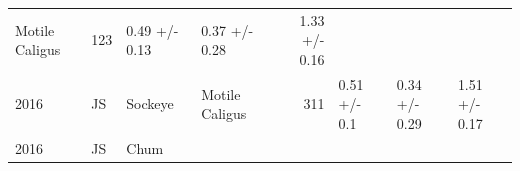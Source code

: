 \documentclass[fleqn,10pt]{wlpeerj} %
\begin{document}
\begin{longtable}[]{@{}llllrlll@{}}
\begin{minipage}[t]{0.11\columnwidth}
Motile Caligus\strut
\end{minipage} & \begin{minipage}[t]{0.04\columnwidth}\raggedleft\strut
123\strut
\end{minipage} & \begin{minipage}[t]{0.14\columnwidth}\raggedright\strut
0.49 +/- 0.13\strut
\end{minipage} & \begin{minipage}[t]{0.14\columnwidth}\raggedright\strut
0.37 +/- 0.28\strut
\end{minipage} & \begin{minipage}[t]{0.14\columnwidth}\raggedright\strut
1.33 +/- 0.16\strut
\end{minipage}\tabularnewline
\begin{minipage}[t]{0.09\columnwidth}\raggedright\strut
2016\strut
\end{minipage} & \begin{minipage}[t]{0.06\columnwidth}\raggedright\strut
JS\strut
\end{minipage} & \begin{minipage}[t]{0.06\columnwidth}\raggedright\strut
Sockeye\strut
\end{minipage} & \begin{minipage}[t]{0.11\columnwidth}\raggedright\strut
Motile Caligus\strut
\end{minipage} & \begin{minipage}[t]{0.04\columnwidth}\raggedleft\strut
311\strut
\end{minipage} & \begin{minipage}[t]{0.14\columnwidth}\raggedright\strut
0.51 +/- 0.1\strut
\end{minipage} & \begin{minipage}[t]{0.14\columnwidth}\raggedright\strut
0.34 +/- 0.29\strut
\end{minipage} & \begin{minipage}[t]{0.14\columnwidth}\raggedright\strut
1.51 +/- 0.17\strut
\end{minipage}\tabularnewline
\begin{minipage}[t]{0.09\columnwidth}\raggedright\strut
2016\strut
\end{minipage} & \begin{minipage}[t]{0.06\columnwidth}\raggedright\strut
JS\strut
\end{minipage} & \begin{minipage}[t]{0.06\columnwidth}\raggedright\strut
Chum\strut
\end{minipage} & \begin{minipage}[t]{0.11\columnwidth}\raggedright\strut

\end{minipage}
\end{longtable}
\end{document}
